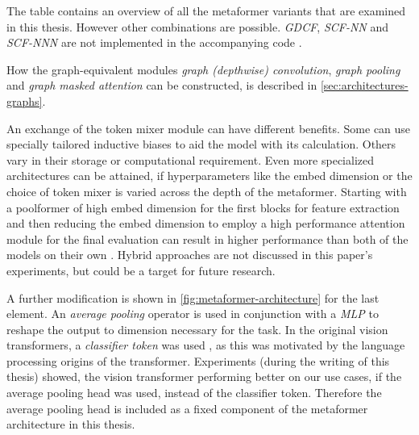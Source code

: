 The table contains an overview of all the metaformer variants that are examined in this thesis.
However other combinations are possible. \emph{GDCF}, \emph{SCF-NN} and \emph{SCF-NNN} are not implemented in the accompanying code \cite{selfPhysics, selfComputerScience}.

How the graph-equivalent modules \emph{graph (depthwise) convolution}, \emph{graph pooling} and \emph{graph masked attention} can be constructed, is described in \autoref{sec:architectures-graphs}.

An exchange of the token mixer module can have different benefits. 
Some can use specially tailored inductive biases to aid the model with its calculation.
Others vary in their storage or computational requirement.
Even more specialized architectures can be attained, if hyperparameters like the embed dimension or the choice of token mixer is varied across the depth of the metaformer. 
Starting with a poolformer of high embed dimension for the first blocks for feature extraction and then reducing the embed dimension to employ a high performance attention module for the final evaluation can result in higher performance than both of the models on their own \cite{metaformerPaper}. 
Hybrid approaches are not discussed in this paper's experiments, but could be a target for future research.

A further modification is shown in \autoref{fig:metaformer-architecture} for the last element.
An \emph{average pooling} operator is used in conjunction with a \emph{MLP} to reshape the output to dimension necessary for the task. 
In the original vision transformers, a \emph{classifier token} was used \cite{dinoPaper}, as this was motivated by the language processing origins of the transformer.
Experiments (during the writing of this thesis) showed, the vision transformer performing better on our use cases, if the average pooling head was used, instead of the classifier token. 
Therefore the average pooling head is included as a fixed component of the metaformer architecture in this thesis.
